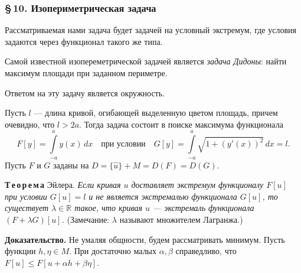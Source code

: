 \documentclass[12pt,a5paper]{book}
\begin{document}
	\subsubsection*{\S\,10. Изопериметрическая задача}
	
	Рассматриваемая нами задача будет задачей на условный экстремум, где условия задаются через функционал такого же типа.
	
	Самой известной изопереметрической задачей является \emph{задача Дидоны}: найти максимум площади при заданном периметре.
	\begin{center}
	\end{center}
	Ответом на эту задачу является окружность.
	
	Пусть $l$ --- длина кривой, огибающей выделенную цветом площадь, причем очевидно, что $l > 2a$. Тогда задача состоит в поиске максимума функционала
	\begin{equation*}
		F[y] = \int\limits_{-a}^a y(x)\,dx \quad \text{при условии} \quad G[y] = \int\limits_{-a}^a \sqrt{1 + (y'(x))^2}\,dx = l.
	\end{equation*}
	Пусть $F$ и $G$ заданы на $D = \{\hat{u}\} + M = D(F) = D(G)$.
	
	\vspace*{1em}
	\noindent \textbf{Т\,е\,о\,р\,е\,м\,а} Эйлера. \textit{Если кривая $u$ доставляет экстремум функционалу $F[u]$ при условии $G[u] = l$ и не является экстремалью функционала $G[u]$, то существует $\lambda \in \mathbb{R}$ такое, что кривая $u$ --- экстремаль функционала $(F + \lambda G)[u]$.} (Замечание: $\lambda$ называют множителем Лагранжа.)
	
	\vspace*{0.5em}
	\noindent \textbf{Доказательство.} Не умаляя общности, будем рассматривать минимум. Пусть функции $h, \eta \in M$. При достаточно малых $\alpha, \beta$ справедливо, что $F[u] \leq F[u + \alpha h + \beta \eta]$.
	
\end{document}
